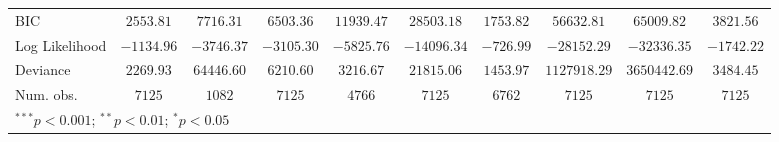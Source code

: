 \begin{tabular}{l c c c c c c c c c}
BIC              & $2553.81$     & $7716.31$     & $6503.36$     & $11939.47$    & $28503.18$    & $1753.82$      & $56632.81$    & $65009.82$    & $3821.56$      \\
Log Likelihood   & $-1134.96$    & $-3746.37$    & $-3105.30$    & $-5825.76$    & $-14096.34$   & $-726.99$      & $-28152.29$   & $-32336.35$   & $-1742.22$     \\
Deviance         & $2269.93$     & $64446.60$    & $6210.60$     & $3216.67$     & $21815.06$    & $1453.97$      & $1127918.29$  & $3650442.69$  & $3484.45$      \\
Num. obs.        & $7125$        & $1082$        & $7125$        & $4766$        & $7125$        & $6762$         & $7125$        & $7125$        & $7125$         \\
\bottomrule
\multicolumn{10}{l}{\scriptsize{$^{***}p<0.001$; $^{**}p<0.01$; $^{*}p<0.05$}}
\end{tabular}
